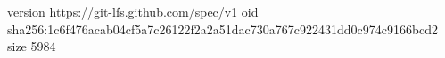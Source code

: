 version https://git-lfs.github.com/spec/v1
oid sha256:1c6f476acab04cf5a7c26122f2a2a51dac730a767c922431dd0c974c9166bcd2
size 5984
